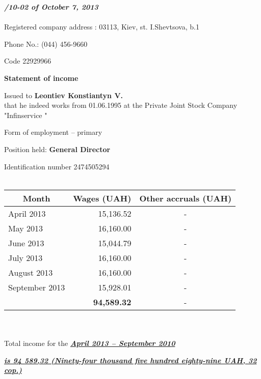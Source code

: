 \documentclass[8pt]{article} %
\begin{document}
\textit{\textbf{ /10-02 of October 7, 2013}}\\\\

\noindent Registered company address : 03113, Kiev, st. I.Shevtsova, b.1

\noindent Phone No.: (044) 456-9660

\noindent Code 22929966

\begin{center}{\bf Statement of income}\end{center}

\noindent Issued to {\bf Leontiev Konstiantyn V.}\\
\noindent that he indeed works from 01.06.1995 at the Private Joint Stock Company "Infinservice "

\noindent Form of employment -- primary

\noindent Position held: {\bf General Director}

\noindent Identification number 2474505294\\\\
\begin{tabular}{|l|r|c|}
	\hline
	\multicolumn{1}{|c|}{Month} & \multicolumn{1}{|c|}{Wages (UAH)} & \multicolumn{1}{|c|}{Other accruals (UAH)}\\
	\hline
	April 2013&15,136.52&-\\
	\hline
	May 2013&16,160.00&-\\
	\hline
	June 2013&15,044.79&-\\
	\hline
	July 2013&16,160.00&-\\
	\hline
	August 2013&16,160.00&-\\
	\hline
	September 2013&15,928.01&-\\
	\hline
	&{\bf 94,589.32}&-\\
	\hline
\end{tabular}\\\\

\noindent Total income for the \underline{\textit{\textbf{ April 2013 -- September 2010}}}

\noindent \underline{\textit{\textbf{ is 94 589,32 (Ninety-four thousand five hundred eighty-nine UAH, 32 cop.)}}}
\end{document}
